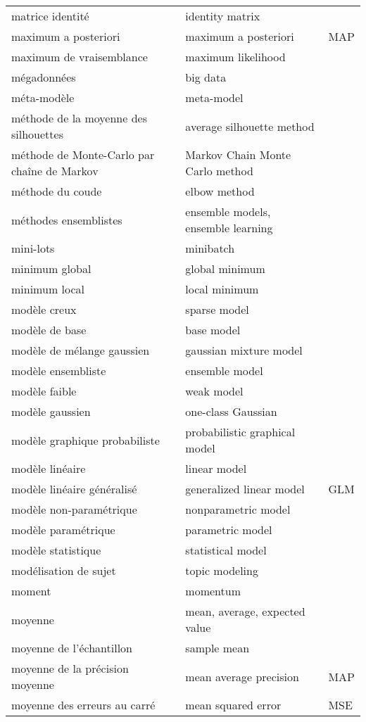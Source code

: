 \begin{longtable}{p{} p{} p{}}
matrice identité & identity matrix &  \\ 
maximum a posteriori & maximum a posteriori & MAP \\ 
maximum de vraisemblance & maximum likelihood &  \\ 
mégadonnées & big data &  \\ 
méta-modèle & meta-model &  \\ 
méthode de la moyenne des silhouettes & average silhouette method &  \\ 
méthode de Monte-Carlo par chaîne de Markov & Markov Chain Monte Carlo method &  \\ 
méthode du coude & elbow method &  \\ 
méthodes ensemblistes & ensemble models, ensemble learning &  \\ 
mini-lots & minibatch &  \\ 
minimum global & global minimum &  \\ 
minimum local & local minimum &  \\ 
modèle creux & sparse model &  \\ 
modèle de base & base model &  \\ 
modèle de mélange gaussien & gaussian mixture model &  \\ 
modèle ensembliste & ensemble model &  \\ 
modèle faible & weak model &  \\ 
modèle gaussien & one-class Gaussian &  \\ 
modèle graphique probabiliste & probabilistic graphical model &  \\ 
modèle linéaire & linear model &  \\ 
modèle linéaire généralisé & generalized linear model & GLM \\ 
modèle non-paramétrique & nonparametric model &  \\ 
modèle paramétrique & parametric model &  \\ 
modèle statistique & statistical model &  \\ 
modélisation de sujet & topic modeling &  \\ 
moment & momentum &  \\ 
moyenne & mean, average, expected value &  \\ 
moyenne de l’échantillon & sample mean &  \\ 
moyenne de la précision moyenne & mean average precision & MAP \\ 
moyenne des erreurs au carré & mean squared error & MSE \\ 

\end{longtable}
